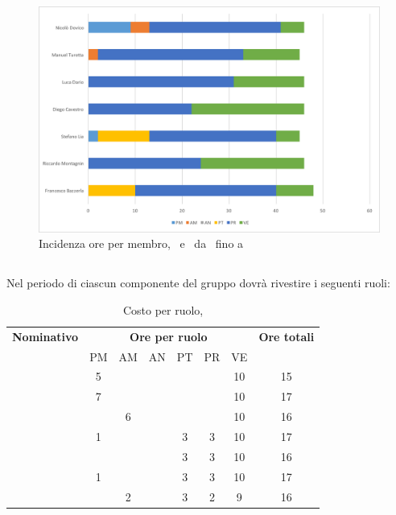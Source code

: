 \begin{figure}[H]
	\centering 
	\includegraphics[scale=0.7]{Immagini/GraficiPianoLavoro/COD.png}
	\caption{Incidenza ore per membro, \PD\ e \COD\ da \RP\ fino a \RQ}
\end{figure}

\newpage
\subsection{\VV}
Nel periodo di \VV{} ciascun componente del gruppo dovrà rivestire i seguenti ruoli:

\begin{table}[h]
	\begin{center}
		\begin{tabular}{|c|c|c|c|c|c|c|c|}
			\hline
			\textbf{Nominativo} & \multicolumn{6}{c|}{\textbf{Ore per ruolo}} & \textbf{Ore totali} \\
					& PM & AM & AN & PT & PR & VE & \\
			\hline
			\FB		& 5  &	  &	   &	&	 & 10 &	15	\\
			\hline
			\RM		& 7	 &	  &	   &	&	 & 10 & 17	\\
			\hline
			\SL		&	 & 6  &	   &	&	 & 10 &	16	\\
			\hline
			\DC		& 1	 &	  &  & 3  &	3 & 10 &	17	\\
			\hline
			\LD 	&	 &	  &	   & 3	&	3 & 10 &	16	\\
			\hline
			\MT		& 1 	 &	  &	   & 3	&	3 & 10 &	17	\\
			\hline
			\ND 	&	 & 2  &	   & 3	&	2 & 9 & 16	\\
			\hline
		\end{tabular}
	\end{center}
	\caption{Costo per ruolo, \VV}
\end{table}

